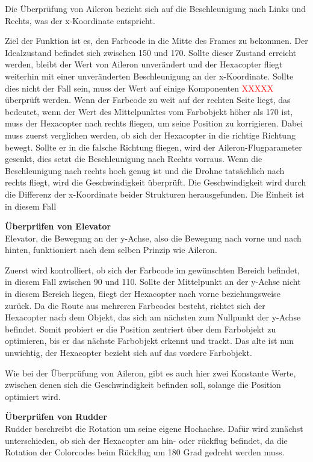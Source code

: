     Die Überprüfung von Aileron bezieht sich auf die Beschleunigung nach Links und Rechts, was der x-Koordinate entspricht.

    Ziel der Funktion ist es, den Farbcode in die Mitte des Frames zu bekommen. Der Idealzustand befindet sich zwischen 150 und 170.
    Sollte dieser Zustand erreicht werden, bleibt der Wert von Aileron unverändert und der Hexacopter fliegt weiterhin mit einer unveränderten Beschleunigung an der x-Koordinate.
    Sollte dies nicht der Fall sein, muss der Wert auf einige Komponenten \textcolor{red}{XXXXX} überprüft werden.
    Wenn der Farbcode zu weit auf der rechten Seite liegt, das bedeutet, wenn der Wert des Mittelpunktes vom Farbobjekt höher als 170 ist,
    muss der Hexacopter nach rechts fliegen, um seine Position zu korrigieren.
    Dabei muss zuerst verglichen werden, ob sich der Hexacopter in die richtige Richtung bewegt. Sollte er in die falsche Richtung
    fliegen, wird der Aileron-Flugparameter gesenkt, dies setzt die Beschleunigung nach Rechts vorraus.
    Wenn die Beschleunigung nach rechts hoch genug ist und die Drohne tatsächlich nach rechts fliegt, wird die Geschwindigkeit überprüft.
    Die Geschwindigkeit wird durch die Differenz der x-Koordinate beider Strukturen herausgefunden. Die Einheit ist in diesem Fall

    \textbf{Überprüfen von Elevator}\\
    Elevator, die Bewegung an der y-Achse, also die Bewegung nach vorne und nach hinten, funktioniert nach dem selben Prinzip wie Aileron. 

    Zuerst wird kontrolliert, ob sich der Farbcode im gewünschten Bereich befindet, in diesem Fall zwischen 90 und 110.
    Sollte der Mittelpunkt an der y-Achse nicht in diesem Bereich liegen, fliegt der Hexacopter nach vorne beziehungsweise zurück.
    Da die Route aus mehreren Farbcodes besteht, richtet sich der Hexacopter nach dem Objekt, das sich am nächsten zum Nullpunkt der y-Achse befindet. Somit probiert er die Position zentriert über dem Farbobjekt zu optimieren, bis er das nächste Farbobjekt erkennt und trackt. Das alte ist nun unwichtig, der Hexacopter bezieht sich auf das vordere Farbobjekt.

    Wie bei der Überprüfung von Aileron, gibt es auch hier zwei Konstante Werte, zwischen denen sich die Geschwindigkeit befinden soll, solange die Position optimiert wird.

    \textbf{Überprüfen von Rudder}\\
    Rudder beschreibt die Rotation um seine eigene Hochachse. Dafür wird zunächst unterschieden, ob sich der Hexacopter am hin- oder rückflug befindet, da die Rotation der Colorcodes beim Rückflug um 180 Grad gedreht werden muss.

